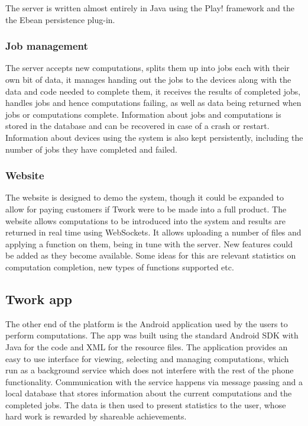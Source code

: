 \documentclass[a4paper,10pt]{article}
\begin{document}
The server is written almost entirely in Java using the Play! framework and the the Ebean persistence plug-in.

\subsubsection{Job management}
The server accepts new computations, splits them up into jobs each with their own bit of data, it manages handing out the jobs to the devices along with
the data and code needed to complete them, it receives the results of completed jobs, handles jobs and hence computations failing, as well
as data being returned when jobs or computations complete.
Information about jobs and computations is stored in the database and can be recovered
in case of a crash or restart.
Information about devices using the system is also kept persistently, including the number of jobs they have completed and failed.

\subsubsection{Website}


The website is designed to demo the system, though it could be expanded to allow for paying customers if Twork were to be made into a full product.
The website allows computations to be introduced into the system and results are returned in real time using WebSockets. It allows uploading a number of files and applying a function on them, being in tune with the server. New features could be added as they become available. Some ideas for this are relevant statistics on computation completion, new types of functions supported etc.


\subsection{Twork app}
The other end of the platform is the Android application used by the users to perform computations. The app was built using the standard Android SDK with Java for the code and XML for the resource files. The application provides an easy to use interface for viewing, selecting and managing computations, which run as a background service which does not interfere with the rest of the phone functionality. Communication with the service happens via message passing and a local database that stores information about the current computations and the completed jobs. The data is then used to present statistics to the user, whose hard work is rewarded by shareable achievements. 
\end{document}
